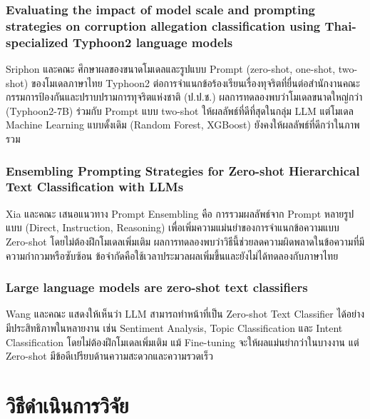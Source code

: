 \subsubsection{Evaluating the impact of model scale and prompting strategies on corruption allegation classification using Thai-specialized Typhoon2 language models \cite{sriphon2025}}

Sriphon และคณะ \cite{sriphon2025} ศึกษาผลของขนาดโมเดลและรูปแบบ Prompt (zero-shot, one-shot, two-shot) ของโมเดลภาษาไทย Typhoon2 ต่อการจำแนกข้อร้องเรียนเรื่องทุจริตที่ยื่นต่อสำนักงานคณะกรรมการป้องกันและปราบปรามการทุจริตแห่งชาติ (ป.ป.ช.) ผลการทดลองพบว่าโมเดลขนาดใหญ่กว่า (Typhoon2-7B) ร่วมกับ Prompt แบบ two-shot ให้ผลลัพธ์ที่ดีที่สุดในกลุ่ม LLM แต่โมเดล Machine Learning แบบดั้งเดิม (Random Forest, XGBoost) ยังคงให้ผลลัพธ์ที่ดีกว่าในภาพรวม

\subsubsection{Ensembling Prompting Strategies for Zero-shot Hierarchical Text Classification with LLMs \cite{xia2024ensembling}}

Xia และคณะ \cite{xia2024ensembling} เสนอแนวทาง Prompt Ensembling คือ การรวมผลลัพธ์จาก Prompt หลายรูปแบบ (Direct, Instruction, Reasoning) เพื่อเพิ่มความแม่นยำของการจำแนกข้อความแบบ Zero-shot โดยไม่ต้องฝึกโมเดลเพิ่มเติม ผลการทดลองพบว่าวิธีนี้ช่วยลดความผิดพลาดในข้อความที่มีความกำกวมหรือซับซ้อน ข้อจำกัดคือใช้เวลาประมวลผลเพิ่มขึ้นและยังไม่ได้ทดลองกับภาษาไทย

\subsubsection{Large language models are zero-shot text classifiers \cite{wang2023zeroshot}}

Wang และคณะ \cite{wang2023zeroshot} แสดงให้เห็นว่า LLM สามารถทำหน้าที่เป็น Zero-shot Text Classifier ได้อย่างมีประสิทธิภาพในหลายงาน เช่น Sentiment Analysis, Topic Classification และ Intent Classification โดยไม่ต้องฝึกโมเดลเพิ่มเติม แม้ Fine-tuning จะให้ผลแม่นยำกว่าในบางงาน แต่ Zero-shot มีข้อดีเปรียบด้านความสะดวกและความรวดเร็ว

\section{วิธีดำเนินการวิจัย}

